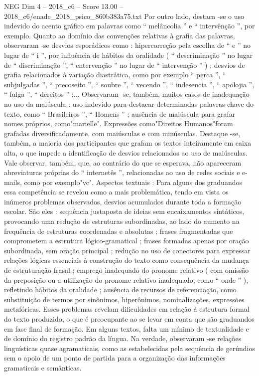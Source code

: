 \begin{textsample}{NEG Dim 4 – 2018\_c6 – Score 13.00 – 2018\_c6/enade\_2018\_psico\_860b383a75.txt}
Por outro lado, destaca -se o uso indevido do acento gráfico em palavras como “ melâncolia ” e “ intervênção ”, por exemplo.
Quanto ao domínio das convenções relativas à grafia das palavras, observaram -se desvios esporádicos como : hipercorreção pela escolha de “ e ” no lugar de “ i ”, por influência de hábitos da oralidade ( “ descriminação ” no lugar de “ discriminação ”, “ entervenção ” no lugar de “ intervenção ” ) ; desvios de grafia relacionados à variação diastrática, como por exemplo “ perca ”, “ subjulgadas ”, “ precoseito ”, “ soubre ”, “ vecendo ”, “ indesencia ”, “ apolojia ”, “ fulga ”, “ dereitos ” ;...
Observaram -se, também, muitos casos de inadequação no uso da maiúscula : uso indevido para destacar determinadas palavras-chave do texto, como “ Brasileiros ”, “ Homens ” ; ausência de maiúscula para grafar nomes próprios, como"marielle".
Expressões como"Direitos Humanos"foram grafadas diversificadamente, com maiúsculas e com minúsculas.
Destaque -se, também, a maioria dos participantes que grafam os textos inteiramente em caixa alta, o que impede a identificação de desvios relacionados ao uso de maiúsculas.
Vale observar, também, que, ao contrário do que se esperava, não apareceram abreviaturas próprias do “ internetês ”, relacionadas ao uso de redes sociais e e-mails, como por exemplo"vc".
Aspectos textuais : Para alguns dos graduandos essa competência se revelou como a mais problemática, tendo em vista os inúmeros problemas observados, desvios acumulados durante toda a formação escolar.
São eles : sequência justaposta de ideias sem encaixamentos sintáticos, provocando uma redução de estruturas subordinadas, ao lado do aumento na frequência de estruturas coordenadas e absolutas ; frases fragmentadas que comprometem a estrutura lógico-gramatical ; frases formadas apenas por oração subordinada, sem oração principal ; redução no uso de conectores para expressar relações lógicas essenciais à construção do texto como consequência da mudança de estruturação frasal ; emprego inadequado do pronome relativo ( com omissão da preposição ou a utilização do pronome relativo inadequado, como “ onde ” ), refletindo hábitos da oralidade ; ausência de recursos de referenciação, como substituição de termos por sinônimos, hiperônimos, nominalizações, expressões metafóricas.
Esses problemas revelam dificuldades em relação à estrutura formal do texto produzido, o que é preocupante ao se levar em conta que são graduandos em fase final de formação.
Em alguns textos, falta um mínimo de textualidade e de domínio do registro padrão da língua.
Na verdade, observaram -se relações linguísticas quase agramaticais, como as estabelecidas pela sequência de gerúndios sem o apoio de um ponto de partida para a organização das informações gramaticais e semânticas.

\end{textsample}

